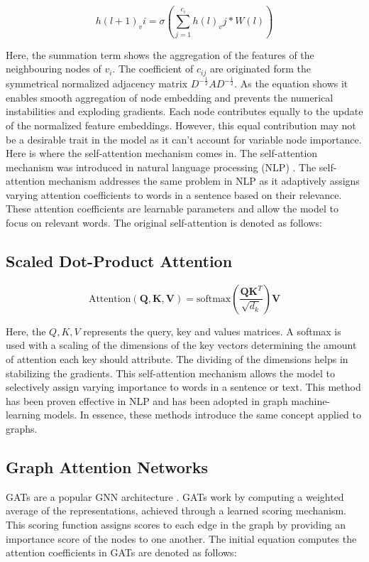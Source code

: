 \documentclass[runningheads]{llncs}
\begin{document}
\begin{equation}
    h(l+1)_vi = \sigma(\sum_{j=1}^{c_i} h(l)_vj * W(l))
\end{equation}

Here, the summation term shows the aggregation of the features of the neighbouring nodes of $v_i$. The coefficient of $c_{ij}$ are originated form the symmetrical normalized adjacency matrix $D^{-\frac{1}{2}}AD^{-\frac{1}{2}}$. As the equation shows it enables smooth aggregation of node embedding and prevents the numerical instabilities and exploding gradients. Each node contributes equally to the update of the normalized feature embeddings. However, this equal contribution may not be a desirable trait in the model as it can't account for variable node importance. Here is where the self-attention mechanism comes in. The self-attention mechanism was introduced in natural language processing (NLP) \cite{Vaswani2017}. The self-attention mechanism addresses the same problem in NLP as it adaptively assigns varying attention coefficients to words in a sentence based on their relevance.  These attention coefficients are learnable parameters and allow the model to focus on relevant words. The original self-attention is denoted as follows:

\subsection{Scaled Dot-Product Attention}
  \begin{equation}
    \text{Attention}(\mathbf{Q}, \mathbf{K}, \mathbf{V}) = \text{softmax}\left(\frac{\mathbf{Q}\mathbf{K}^T}{\sqrt{d_k}}\right) \mathbf{V}
\end{equation}

Here, the $Q, K, V $ represents the query, key and values matrices. A softmax is used with a scaling of the dimensions of the key vectors determining the amount of attention each key should attribute. The dividing of the dimensions helps in stabilizing the gradients. This self-attention mechanism allows the model to selectively assign varying importance to words in a sentence or text. This method has been proven effective in NLP and has been adopted in graph machine-learning models. In essence, these methods introduce the same concept applied to graphs. 

\subsection{Graph Attention Networks}
GATs are a popular GNN architecture \cite{Brody2021}. GATs work by computing a weighted average of the representations, achieved through a learned scoring mechanism.  This scoring function assigns scores to each edge in the graph by providing an importance score of the nodes to one another. The initial equation computes the attention coefficients in GATs are denoted as follows:
\end{document}
